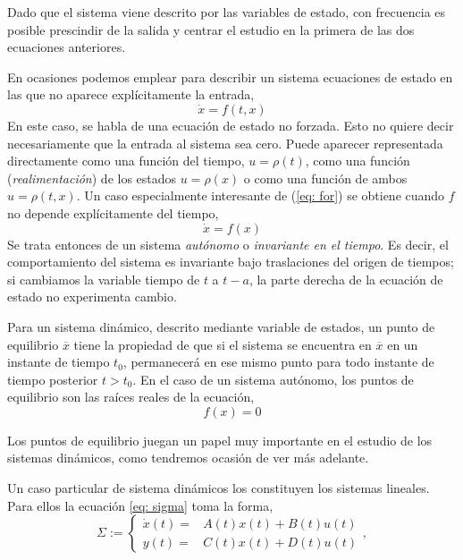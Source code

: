 Dado que el sistema viene descrito por las variables de estado,  con frecuencia es posible prescindir de la salida y centrar el estudio en la primera de las dos ecuaciones anteriores.

 En ocasiones podemos emplear para describir un sistema ecuaciones de estado en las que no aparece explícitamente la entrada,
\begin{equation}
\dot x = f(t,x)
\end{equation}\label{eq: for}
En este caso, se habla de una ecuación de estado no forzada. Esto no quiere decir necesariamente que la entrada al sistema sea cero. Puede aparecer representada directamente como una función del tiempo, $u=\rho(t)$,  como una función (\emph{realimentación}) de los estados $u = \rho(x)$ o como una función de ambos $u=\rho(t,x)$.
Un caso especialmente interesante de (\ref{eq: for}) se obtiene cuando $f$ no depende explícitamente del tiempo,
\begin{equation}
\dot x = f(x)
\end{equation}
Se trata entonces de un sistema \emph{autónomo} o \emph{invariante en el tiempo}. Es decir, el comportamiento del sistema es invariante bajo traslaciones del origen de tiempos; si cambiamos la variable tiempo de $t$ a $t-a$, la parte derecha de la ecuación de estado no experimenta cambio.

Para un sistema dinámico, descrito mediante variable de estados, un punto de equilibrio $\overline x$  tiene la propiedad de que si el sistema se encuentra en $\overline x$ en un instante de tiempo $t_0$, permanecerá en ese  mismo punto para todo instante de tiempo posterior $t>t_0$. En el caso de un sistema autónomo, los puntos de equilibrio son las raíces reales de la ecuación,
\begin{equation}
f(x)=0
\end{equation} 

Los puntos de equilibrio juegan un papel muy importante en el estudio de los sistemas dinámicos, como tendremos ocasión de ver más adelante.

Un caso particular de sistema dinámicos los constituyen los sistemas lineales. Para ellos la ecuación \ref{eq: sigma} toma la forma,
\begin{equation}
	\Sigma := \begin{cases}
		\dot x(t) =& A(t)x(t)+B(t)u(t) \\ y(t) =& C(t)x(t)+D(t)u(t)
	\end{cases}, 
\label{eq: sigmaL}
\end{equation}

